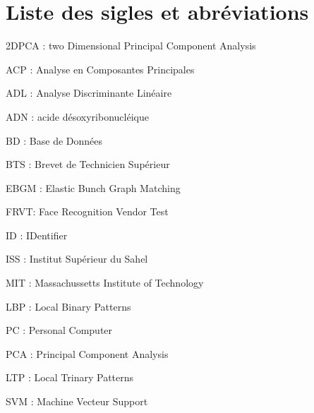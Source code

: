 \chapter*{Liste des sigles et abréviations}

2DPCA : two Dimensional Principal Component Analysis

ACP : Analyse en Composantes Principales 

ADL : Analyse Discriminante Linéaire

ADN : acide désoxyribonucléique 

BD : Base de Données

BTS : Brevet de Technicien Supérieur

EBGM : Elastic Bunch Graph Matching

FRVT: Face Recognition Vendor Test

ID  : IDentifier

ISS : Institut Supérieur du Sahel

MIT : Massachussetts Institute of Technology

LBP : Local Binary Patterns

PC : Personal Computer

PCA : Principal Component Analysis

LTP : Local Trinary Patterns

SVM : Machine Vecteur Support